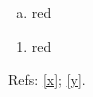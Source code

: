 \documentclass{article}
\begin{document}
\begin{enumerate}[(a)]
\item\label{x} red
\end{enumerate}
\begin{enumerate}[label=(\alph*)]
\item\label{y} red
\end{enumerate}
Refs: \ref{x}; \ref{y}.
\end{document}
